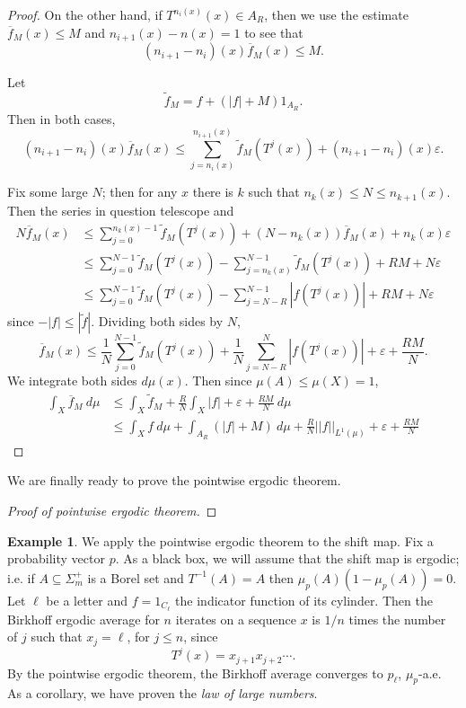 \documentclass[12pt]{report}
\newcommand{\dfn}[1]{\emph{#1}\index{#1}}
\theoremstyle{definition}
\newtheorem{example}[theorem]{Example}
\begin{document}
\begin{proof}
On the other hand, if $T^{n_i(x)}(x) \in A_R$, then we use the estimate $\overline f_M(x) \leq M$ and $n_{i+1}(x) - n(x) = 1$ to see that
$$(n_{i+1} - n_i)(x) \overline f_M(x) \leq M.$$

Let
$$\tilde f_M = f + (|f| + M)1_{A_R}.$$
Then in both cases,
$$(n_{i+1} - n_i)(x) \overline f_M(x) \leq \sum_{j=n_i(x)}^{n_{i+1}(x)} \tilde f_M(T^j(x)) + (n_{i+1} - n_i)(x)\varepsilon.$$

Fix some large $N$; then for any $x$ there is $k$ such that $n_k(x) \leq N \leq n_{k+1}(x)$. Then the series in question telescope and
\begin{align*}N \overline f_M(x) &\leq \sum_{j=0}^{n_k(x) - 1} \tilde f_M(T^j(x)) + (N - n_k(x))\overline f_M(x) + n_k(x)\varepsilon
\\& \leq \sum_{j=0}^{N-1} \tilde f_M(T^j(x)) - \sum_{j=n_k(x)}^{N-1} \tilde f_M(T^j(x)) + RM + N\varepsilon
\\& \leq \sum_{j=0}^{N-1} \tilde f_M(T^j(x)) - \sum_{j = N-R}^{N-1} |f(T^j(x))| + RM + N\varepsilon
\end{align*}
since $-|f| \leq |\tilde f|$. Dividing both sides by $N$,
$$\overline f_M(x) \leq \frac{1}{N} \sum_{j=0}^{N-1} \tilde f_M(T^j(x)) + \frac{1}{N} \sum_{j=N-R}^N |f(T^j(x))| + \varepsilon + \frac{RM}{N}.$$
We integrate both sides $d\mu(x)$. Then since $\mu(A) \leq \mu(X) = 1$,
\begin{align*}\int_X \overline f_M ~d\mu &\leq \int_X \tilde f_M + \frac{R}{N} \int_X |f| + \varepsilon + \frac{RM}{N} ~d\mu
\\ &\leq \int_X f~d\mu + \int_{A_R} (|f| + M)~d\mu + \frac{R}{N} ||f||_{L^1(\mu)} + \varepsilon + \frac{RM}{N}
\end{align*}
\end{proof}
We are finally ready to prove the pointwise ergodic theorem.
\begin{proof}[Proof of pointwise ergodic theorem]

\end{proof}
\begin{example}
We apply the pointwise ergodic theorem to the shift map. Fix a probability vector $p$. As a black box, we will assume that the shift map is ergodic; i.e. if $A \subseteq \Sigma_m^+$ is a Borel set and $T^{-1}(A) = A$ then $\mu_p(A)(1 - \mu_p(A)) = 0$. Let $\ell$ be a letter and $f = 1_{C_\ell}$ the indicator function of its cylinder. Then the Birkhoff ergodic average for $n$ iterates on a sequence $x$ is $1/n$ times the number of $j$ such that $x_j = \ell$, for $j \leq n$, since
$$T^j(x) = x_{j+1}x_{j+2}\cdots.$$
By the pointwise ergodic theorem, the Birkhoff average converges to $p_\ell$, $\mu_p$-a.e. As a corollary, we have proven the \dfn{law of large numbers}.
\end{example}
\end{document}
